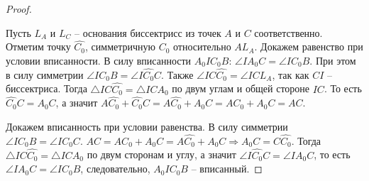 \documentclass[12pt]{article}
\theoremstyle{definition}
\begin{document}
\begin{proof}
\begin{center}
        \end{center}
        Пусть $L_A$ и $L_C$ -- основания биссектрисс из точек $A$ и $C$ соответственно. Отметим точку $\widehat{C_0}$, симметричную $C_0$ относительно $AL_A$. Докажем равенство при условии вписанности. В силу вписанности $A_0IC_0B$: $\angle IA_0C=\angle IC_0B$. При этом в силу симметрии $\angle IC_0B=\angle I\widehat{C_0}C$. Также $\angle IC\widehat{C_0}=\angle ICL_A$, так как $CI$ -- биссектриса. Тогда $\triangle IC\widehat{C_0} = \triangle ICA_0$ по двум углам и общей стороне $IC$. То есть $\widehat{C_0}C=A_0C$, а значит $A\widehat{C_0} + \widehat{C_0}C=A\widehat{C_0}+A_0C=AC_0+A_0C=AC$.\bigskip

        Докажем вписанность при условии равенства. В силу симметрии $\angle IC_0B=\angle I\widehat{C_0}C$. $AC=AC_0+A_0C=A\widehat{C_0}+A_0C\Longrightarrow A_0C=C\widehat{C_0}$. Тогда $\triangle IC\widehat{C_0} = \triangle ICA_0$ по двум сторонам и углу, а значит $\angle I\widehat{C_0}C=\angle IA_0C$, то есть $\angle IA_0C=\angle IC_0B$, следовательно, $A_0IC_0B$ -- вписанный.
    \end{proof}
\end{document}
